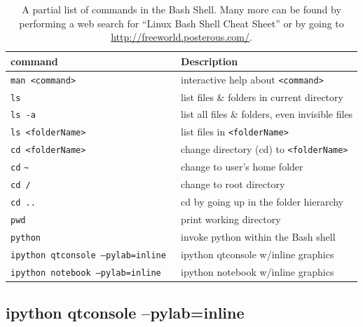 \begin{table}
\centering
\caption{A partial list of commands in the Bash Shell. Many more can be found by performing a web search for ``Linux Bash Shell Cheat Sheet'' or by going to \href{http://freeworld.posterous.com/}{http://freeworld.posterous.com/}.  }
\label{tab:bashCommands}       %
\begin{tabular}{ll}
\toprule
command\hspace*{7mm} & Description  \\
\midrule
\texttt{man <command>} 	&	interactive help about \texttt{<command>}\\
\texttt{ls} 	&	list files \& folders in current directory\\
\texttt{ls -a}  &	list all files \& folders, even invisible files\\
\texttt{ls <folderName>} 	&	list files in \texttt{<folderName>} \\

\texttt{cd <folderName>} 	& change directory (cd) to \texttt{<folderName>} \\
\texttt{cd} \verb!~! 	&	change to user's home folder\\
\texttt{cd /} 	&	change to root directory\\
\texttt{cd ..} 	&	cd by going up in the folder hierarchy\\

\texttt{pwd} 	&	print working directory\\
\texttt{python}	& invoke python within the Bash shell\\
\texttt{ipython qtconsole --pylab=inline  } & ipython qtconsole w/inline graphics\\
\texttt{ipython notebook --pylab=inline} & ipython notebook w/inline graphics\\


\bottomrule
\end{tabular}
\end{table}
%



\subsection{ipython qtconsole --pylab=inline }
\label{sec:iPython-qtconsole}

